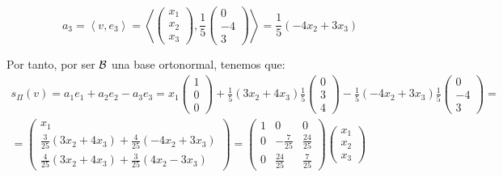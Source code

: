 \begin{ejercicio}
\begin{enumerate}
\begin{equation*}
            a_3 = \left\langle 
                v, e_3\right\rangle
                = \left\langle 
                \left(\begin{array}{c}
                     x_1 \\ x_2 \\ x_3
                \end{array}\right),
                \frac{1}{5}
                \left(\begin{array}{c}
                     0 \\ -4 \\ 3
                \end{array}\right)
                \right\rangle
                = \frac{1}{5}(-4x_2+3x_3)
        \end{equation*}


        Por tanto, por ser $\mathcal{B}$ una base ortonormal, tenemos que:
        \begin{multline*}
            s_{\Pi}(v) = a_1e_1 + a_2e_2 -a_3e_3= x_1\left(\begin{array}{c}
                     1 \\ 0 \\ 0
                \end{array}\right) + \frac{1}{5}(3x_2+4x_3)\frac{1}{5}
                \left(\begin{array}{c}
                     0 \\ 3 \\ 4
                \end{array}\right)
                - \frac{1}{5}(-4x_2+3x_3)\frac{1}{5}
                \left(\begin{array}{c}
                     0 \\ -4 \\ 3
                \end{array}\right) =\\
                = \left(\begin{array}{c}
                     x_1 \\
                     \frac{3}{25}(3x_2+4x_3) +\frac{4}{25}(-4x_2+3x_3) \\
                     \frac{4}{25}(3x_2+4x_3) +\frac{3}{25}(4x_2-    3x_3)
                \end{array}\right)
                =
                \left(\begin{array}{ccc}
                     1 & 0 & 0 \\
                     0 & -\frac{7}{25} & \frac{24}{25} \\
                     0 & \frac{24}{25} & \frac{7}{25}
                \end{array}\right)
                \left(\begin{array}{c}
                     x_1 \\ x_2 \\ x_3
                \end{array}\right)
        \end{multline*}


\end{enumerate}
\end{ejercicio}
